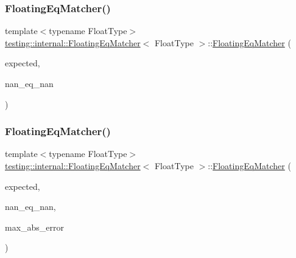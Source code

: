 \subsubsection{\texorpdfstring{Floating\+Eq\+Matcher()}{FloatingEqMatcher()}\hspace{0.1cm}{\footnotesize\ttfamily [1/2]}}
{\footnotesize\ttfamily template$<$typename Float\+Type$>$ \\
\hyperlink{classtesting_1_1internal_1_1_floating_eq_matcher}{testing\+::internal\+::\+Floating\+Eq\+Matcher}$<$ Float\+Type $>$\+::\hyperlink{classtesting_1_1internal_1_1_floating_eq_matcher}{Floating\+Eq\+Matcher} (\begin{DoxyParamCaption}\item[{Float\+Type}]{expected,  }\item[{bool}]{nan\+\_\+eq\+\_\+nan }\end{DoxyParamCaption})\hspace{0.3cm}{\ttfamily [inline]}}

\mbox{\label{classtesting_1_1internal_1_1_floating_eq_matcher_a07674c4b017965493a3c20a218f9a74f}} 
\subsubsection{\texorpdfstring{Floating\+Eq\+Matcher()}{FloatingEqMatcher()}\hspace{0.1cm}{\footnotesize\ttfamily [2/2]}}
{\footnotesize\ttfamily template$<$typename Float\+Type$>$ \\
\hyperlink{classtesting_1_1internal_1_1_floating_eq_matcher}{testing\+::internal\+::\+Floating\+Eq\+Matcher}$<$ Float\+Type $>$\+::\hyperlink{classtesting_1_1internal_1_1_floating_eq_matcher}{Floating\+Eq\+Matcher} (\begin{DoxyParamCaption}\item[{Float\+Type}]{expected,  }\item[{bool}]{nan\+\_\+eq\+\_\+nan,  }\item[{Float\+Type}]{max\+\_\+abs\+\_\+error }\end{DoxyParamCaption})\hspace{0.3cm}{\ttfamily [inline]}}



